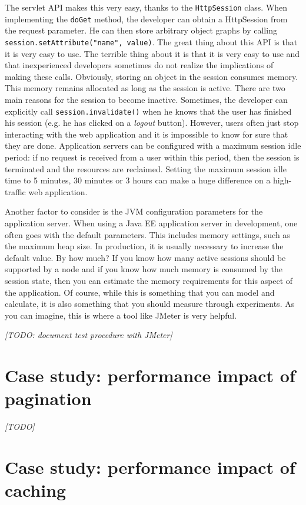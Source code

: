The servlet API makes this very easy, thanks to the \texttt{HttpSession} class. When implementing the \texttt{doGet} method, the developer can obtain a HttpSession from the request parameter. He can then store arbitrary object graphs by calling \texttt{session.setAttribute("name", value)}. The great thing about this API is that it is very easy to use. The terrible thing about it is that it is very easy to use and that inexperienced developers sometimes do not realize the implications of making these calls. Obviously, storing an object in the session consumes memory. This memory remains allocated as long as the session is active. There are two main reasons for the session to become inactive. Sometimes, the developer can explicitly call \texttt{session.invalidate()} when he knows that the user has finished his session (e.g. he has clicked on a \emph{logout} button). However, users often just stop interacting with the web application and it is impossible to know for sure that they are done. Application servers can be configured with a maximum session idle period: if no request is received from a user within this period, then the session is terminated and the resources are reclaimed. Setting the maximum session idle time to 5 minutes, 30 minutes or 3 hours can make a huge difference on a high-traffic web application.

Another factor to consider is the \ac{JVM} configuration parameters for the application server. When using a Java EE application server in development, one often goes with the default parameters. This includes memory settings, such as the maximum heap size. In production, it is usually necessary to increase the default value. By how much? If you know how many active sessions should be supported by a node and if you know how much memory is consumed by the session state, then you can estimate the memory requirements for this aspect of the application. Of course, while this is something that you can model and calculate, it is also something that you should measure through experiments. As you can imagine, this is where a tool like JMeter is very helpful.

\emph{[TODO: document test procedure with JMeter]}


\section{Case study: performance impact of pagination}

\emph{[TODO]}

\section{Case study: performance impact of caching}

